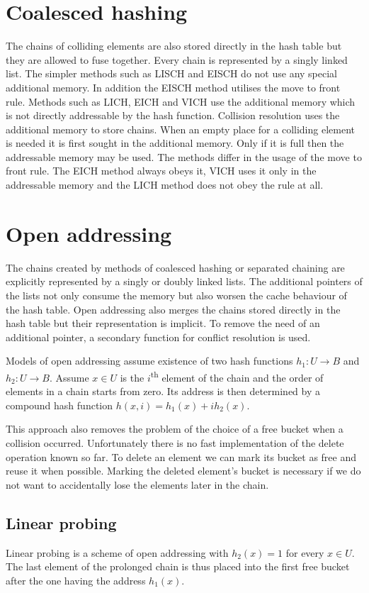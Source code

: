 \section{Coalesced hashing}
The chains of colliding elements are also stored directly in the hash table but they are allowed to fuse together. Every chain is represented by a singly linked list. The simpler methods such as LISCH and EISCH do not use any special additional memory. In addition the EISCH method utilises the move to front rule. Methods such as LICH, EICH and VICH use the additional memory which is not directly addressable by the hash function. Collision resolution uses the additional memory to store chains. When an empty place for a colliding element is needed it is first sought in the additional memory. Only if it is full then the addressable memory may be used. The methods differ in the usage of the move to front rule. The EICH method always obeys it, VICH uses it only in the addressable memory and the LICH method does not obey the rule at all.

\section{Open addressing}
The chains created by methods of coalesced hashing or separated chaining are explicitly represented by a singly or doubly linked lists. The additional pointers of the lists not only consume the memory but also worsen the cache behaviour of the hash table. Open addressing also merges the chains stored directly in the hash table but their representation is implicit. To remove the need of an additional pointer, a secondary function for conflict resolution is used.

Models of open addressing assume existence of two hash functions $h_1: U \rightarrow B$ and $h_2: U \rightarrow B$. Assume $x \in U$ is the $i$\textsuperscript{th} element of the chain and the order of elements in a chain starts from zero. Its address is then determined by a compound hash function $h(x, i) = h_1(x) + i h_2(x)$.

This approach also removes the problem of the choice of a free bucket when a collision occurred. Unfortunately there is no fast implementation of the delete operation known so far. To delete an element we can mark its bucket as free and reuse it when possible. Marking the deleted element's bucket is necessary if we do not want to accidentally lose the elements later in the chain.

\subsection{Linear probing}
Linear probing is a scheme of open addressing with $h_2(x) = 1$ for every $x \in U$. The last element of the prolonged chain is thus placed into the first free bucket after the one having the address $h_1(x)$.

